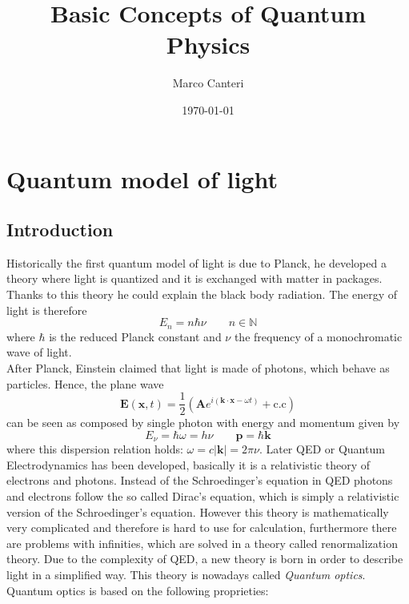 \documentclass[12pt]{article}
\title{\textbf{Basic Concepts of Quantum Physics}}
\author{Marco Canteri}
\date{\today}
\theoremstyle{plain}
\newcommand{\N}{\mathbb{N}}
\renewcommand{\k}{\mathbf{k}}
\newcommand{\x}{\mathbf{x}}
\newcommand{\p}{\mathbf{p}}
\theoremstyle{definition}
\theoremstyle{remark}
\begin{document}
\maketitle
\section{Quantum model of light}
\subsection{Introduction}
Historically the first quantum model of light is due to Planck, he developed a theory where light is quantized and it is exchanged with matter in packages. Thanks to this theory he could explain the black body radiation. The energy of light is therefore
\begin{equation} E_n = n\hbar \nu \qquad n\in \N\end{equation}
where $\hbar$ is the reduced Planck constant and $\nu$ the frequency of a monochromatic wave of light.\\
After Planck, Einstein claimed that light is made of photons, which behave as particles. Hence, the plane wave
\begin{equation}\mathbf{E}(\x,t) = \frac{1}{2}\left(\mathbf{A}e^{i(\k\cdot \x-\omega t)} + \text{c.c}\right)\end{equation}
can be seen as composed by single photon with energy and momentum given by
\begin{equation}E_\nu = \hbar \omega = h\nu \qquad \p = \hbar \k\end{equation}
where this dispersion relation holds: $\omega = c |\k| = 2\pi \nu $. Later QED or Quantum Electrodynamics has been developed, basically it is a relativistic theory of electrons and photons. Instead of the Schroedinger's equation in QED photons and electrons follow the so called Dirac's equation, which is simply a relativistic version of the Schroedinger's equation. However this theory is mathematically very complicated and therefore is hard to use for calculation, furthermore there are problems with infinities, which are solved in a theory called renormalization theory. Due to the complexity of QED, a new theory is born in order to describe light in a simplified way. This theory is nowadays called \emph{Quantum optics}.\\
Quantum optics is based on the following proprieties:
\end{document}
